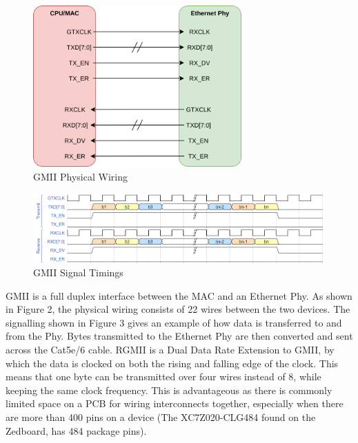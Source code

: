 \begin{figure}[H]
    \begin{center}
        \includegraphics[keepaspectratio,width=8cm]{Images/GMIIWiring}
        \caption{GMII Physical Wiring}
        \label{fig:gmiiwiring}
    \end{center}
\end{figure}

\begin{figure}[H]
    \begin{center}
        \includegraphics[keepaspectratio,width=15cm]{Images/GMIISignaling}
        \caption{GMII Signal Timings}
        \label{fig:gmiisignals}
    \end{center}
\end{figure}

\par GMII is a full duplex interface between the MAC and an Ethernet Phy. As shown in Figure 2, the physical wiring 
consists of 22 wires between the two devices. The signalling shown in Figure 3 gives an example of how data is 
transferred to and from the Phy. Bytes transmitted to the Ethernet Phy are then converted and sent across the 
Cat5e/6 cable. RGMII is a Dual Data Rate Extension to GMII, by which the data is clocked on both the rising and 
falling edge of the clock. This means that one byte can be transmitted over four wires instead of 8, while keeping 
the same clock frequency. This is advantageous as there is commonly limited space on a PCB for wiring interconnects 
together, especially when there are more than 400 pins on a device (The XC7Z020-CLG484 found on the Zedboard, has 
484 package pins). 


